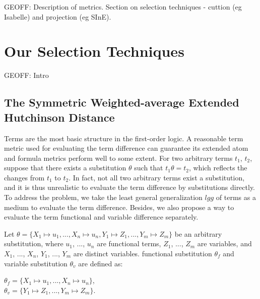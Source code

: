\documentclass[EPiC]{easychair}
\begin{document}
GEOFF:
Description of metrics.
Section on selection techniques - cuttion (eg Isabelle) and projection (eg
SInE). 


\section{Our Selection Techniques}
\label{Ours}

GEOFF:
Intro
\subsection{The Symmetric Weighted-average Extended Hutchinson Distance}
\label{QinghuaDistance}

Terms are the most basic structure in the first-order logic. 
A reasonable term metric used for evaluating the term difference can guarantee 
its extended atom and formula metrics perform well to some extent. 
For two arbitrary terms $t_1$, $t_2$, suppose that there exists a substitution 
$\theta$ such that $t_1\theta=t_2$, which reflects the changes from 
$t_1$ to $t_2$. 
In fact, not all two arbitrary terms exist a substitution, and it is thus 
unrealistic to evaluate the term difference by substitutions directly. 
To address the problem, we take the least general generalization $lgg$ of 
terms as a medium to evaluate the term difference. 
Besides, we also propose a way to evaluate the term functional and variable 
difference separately.

Let 
$\theta=\{X_1\mapsto u_1, ..., X_n\mapsto u_n, Y_1\mapsto Z_1, ..., Y_m\mapsto Z_m\}$ 
be an arbitrary substitution, where $u_1$, ..., $u_n$ are functional terms, 
$Z_1$, ..., $Z_m$ are variables, and $X_1$, ..., $X_n$, $Y_1$, ..., $Y_m$ 
are distinct variables. 
functional substitution $\theta_f$ and variable substitution $\theta_v$ are 
defined as:
	\begin{center}
		$\theta_{f}=\{X_1\mapsto u_1, ..., X_n\mapsto u_n\}$, \\
		$\theta_{v}=\{Y_1\mapsto Z_1, ..., Y_m\mapsto Z_m\}$.
	\end{center}
	
\end{document}
